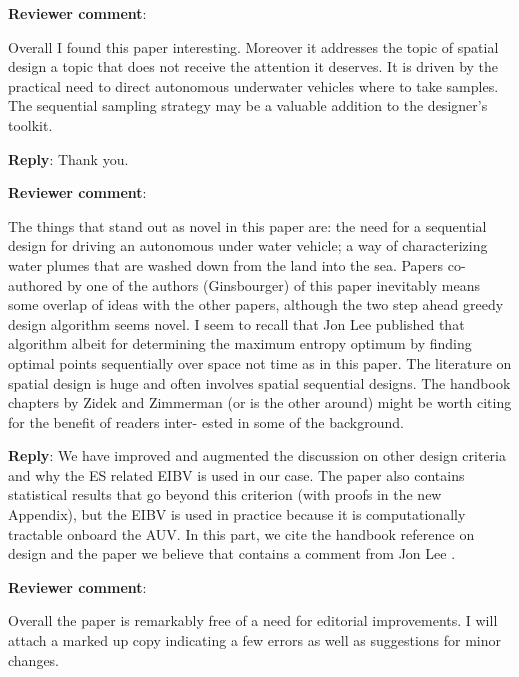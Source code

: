 \documentclass[a4paper]{article}
\newcounter{reviewer}
\def\revcom{\textbf{Reviewer comment}}
\def\reply{\textbf{Reply}}
\begin{document}
\setcounter{reviewer}{1}

\begin{answers}


\item{\revcom  :}\label{r1c3}

Overall I found this paper interesting. Moreover it addresses the topic of spatial design a topic that does not receive the attention it deserves. It is driven by the practical need to direct autonomous underwater vehicles where to take samples. The sequential sampling strategy may be a valuable addition to the designer’s toolkit.

\reply: Thank you. 

\item{\revcom  :}\label{r1c3}

The things that stand out as novel in this paper are: the need for a sequential design for driving an autonomous under water vehicle; a way of characterizing water plumes that are washed down from the land into the sea. Papers co-authored by one of the authors (Ginsbourger) of this paper inevitably means some overlap of ideas with the other papers, although the two step ahead greedy design algorithm seems novel. I seem to recall that Jon Lee published that algorithm albeit for determining the maximum entropy optimum by finding optimal points sequentially over space not time as in this paper. The literature on spatial design is huge and often involves spatial sequential designs. The handbook chapters by Zidek and Zimmerman (or is the other around) might be worth citing for the benefit of readers inter- ested in some of the background.

\reply: We have improved and augmented the discussion on other design criteria and why the ES related EIBV is used in our case. The paper also contains statistical results that go beyond this criterion (with proofs in the new Appendix), but the EIBV is used in practice because it is computationally tractable onboard the AUV. In this part, we cite the handbook reference on design \cite{zidek2019monitoring} and the paper we believe that contains a comment from Jon Lee \citep{bueso1998state}.  

\item{\revcom  :}\label{r1c3}

Overall the paper is remarkably free of a need for editorial improvements. I will attach a marked up copy indicating a few errors as well as suggestions for minor changes.


\end{answers}
\end{document}

